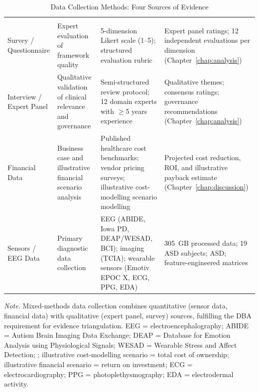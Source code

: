 {\tablestripes\tablefontsize
\begin{xltabular}{\textwidth}{@{} >{\raggedright\arraybackslash}p{2.2cm} L L L @{}}
\caption[Data Collection Methods]{Data Collection Methods: Four Sources of Evidence}\label{tab:data_collection_methods} \\
\toprule
{} &  &  &  \\
\midrule
\endfirsthead
\toprule
{} &  &  &  \\
\midrule
\endhead
\bottomrule
\endlastfoot
Survey / Questionnaire & Expert evaluation of framework quality & 5-dimension Likert scale (1--5); structured evaluation rubric & Expert panel ratings; 12 independent evaluations per dimension (Chapter~\ref{chap:analysis}) \\
\addlinespace
Interview / Expert Panel & Qualitative validation of clinical relevance and governance & Semi-structured review protocol; 12 domain experts with $\geq$5 years experience & Qualitative themes; consensus ratings; governance recommendations (Chapter~\ref{chap:analysis}) \\
\addlinespace
Financial Data & Business case and illustrative financial scenario analysis & Published healthcare cost benchmarks; vendor pricing surveys; illustrative cost-modelling scenario modelling & Projected cost reduction, ROI, and illustrative payback estimate (Chapter~\ref{chap:discussion}) \\
\addlinespace
Sensors / EEG Data & Primary diagnostic data collection & EEG (ABIDE, Iowa PD, DEAP/WESAD, BCI); imaging (TCIA); wearable sensors (Emotiv EPOC X, ECG, PPG, EDA) & 305~GB processed data; 19 ASD subjects; ASD; feature-engineered matrices \\
\end{xltabular}}
\vspace{0.5em}
\noindent\textit{Note.} Mixed-methods data collection combines quantitative (sensor data, financial data) with qualitative (expert panel, survey) sources, fulfilling the DBA requirement for evidence triangulation. EEG = electroencephalography; ABIDE = Autism Brain Imaging Data Exchange; DEAP = Database for Emotion Analysis using Physiological Signals; WESAD = Wearable Stress and Affect Detection; ;  illustrative cost-modelling scenario = total cost of ownership; illustrative financial scenario = return on investment; ECG = electrocardiography; PPG = photoplethysmography; EDA = electrodermal activity.
\fi %

